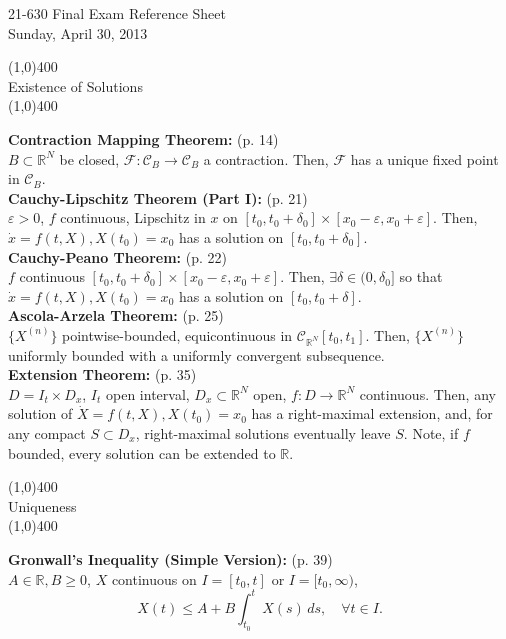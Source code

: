 \documentclass[11pt]{article}
\newcommand{\mydate}{Sunday, April 30, 2013}
\newcommand{\R}{\mathbb{R}}                         %
\newcommand{\F}{\mathcal{F}}
\newcommand{\C}{\mathcal{C}}
\newcommand{\e}{\varepsilon}                        %
\begin{document}
\thispagestyle{plain}

\begin{center}
{\Large 21-630 Final Exam Reference Sheet} \\
\mydate
\end{center}
\begin{center}
\line(1,0){400}\\
{\large Existence of Solutions}\\
\vspace{-0.1in}
\line(1,0){400}
\end{center}
{\bf Contraction Mapping Theorem:} (p. 14)\\
$B \subset \R^N$ be closed, $\F : \C_B \to \C_B$ a contraction. Then, $\F$ has
a unique fixed point in $\C_B$.\\
{\bf Cauchy-Lipschitz Theorem (Part I):} (p. 21)\\
$\e > 0$, $f$ continuous, Lipschitz in $x$ on
$[t_0,t_0 + \delta_0] \times [x_0 - \e,x_0 + \e]$. Then, $\dot x = f(t,X),
X(t_0) = x_0$ has a solution on $[t_0,t_0 + \delta_0]$.\\
{\bf Cauchy-Peano Theorem:} (p. 22)\\
$f$ continuous
$[t_0,t_0 + \delta_0] \times [x_0 - \e,x_0 + \e]$. Then,
$\exists \delta \in (0,\delta_0]$ so that $\dot x = f(t,X), X(t_0) = x_0$ has a
solution on $[t_0,t_0 + \delta]$.\\
{\bf Ascola-Arzela Theorem:} (p. 25)\\
$\{X^{(n)}\}$ pointwise-bounded, equicontinuous in $\C_{\R^N}[t_0,t_1]$. Then,
$\{X^{(n)}\}$ uniformly bounded with a uniformly convergent subsequence.\\
{\bf Extension Theorem:} (p. 35)\\
$D = I_t \times D_x$, $I_t$ open interval, $D_x \subset \R^N$ open,
$f : D \to \R^N$ continuous. Then, any solution of $\dot X = f(t,X),
X(t_0) = x_0$ has a right-maximal extension, and, for any compact
$S \subset D_x$, right-maximal solutions eventually leave $S$. Note, if $f$
bounded, every solution can be extended to $\R$.
\begin{center}
\line(1,0){400}\\
{\large Uniqueness}\\
\vspace{-0.1in}
\line(1,0){400}
\end{center}
{\bf Gronwall's Inequality (Simple Version):} (p. 39)\\
$A \in \R, B \geq 0$, $X$ continuous on $I = [t_0,t]$ or $I = [t_0,\infty)$,
\[X(t) \leq A + B\int_{t_0}^t X(s) \, ds, \quad \forall t \in I.\]
\end{document}
